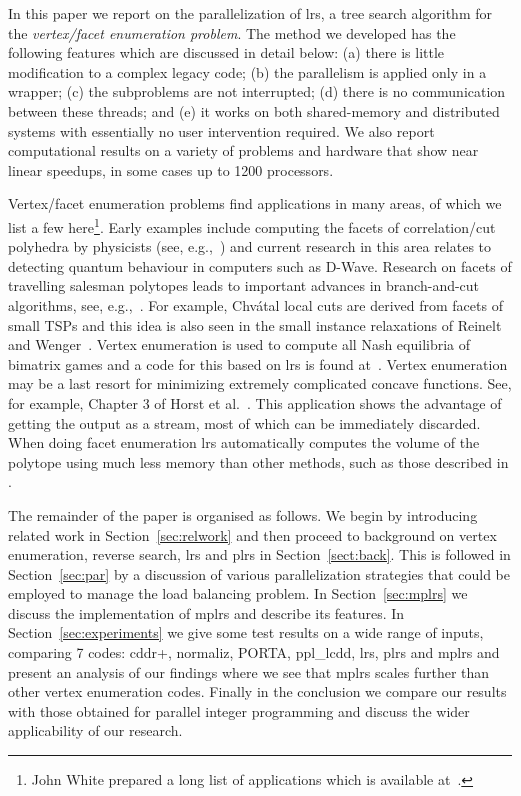 \documentclass[a4paper,11pt]{article}   \usepackage{authblk} \usepackage[top=1.9cm,bottom=1.9cm,left=1.9cm,right=1.9cm]{geometry}
\newcommand{\progname}{\textsf}
\newcommand{\lrs}{\progname{lrs}\xspace}
\newcommand{\plrs}{\progname{plrs}\xspace}
\newcommand{\mplrs}{\progname{mplrs}\xspace}
\newcommand{\norm}{\progname{normaliz}\xspace}
\newcommand{\cdd}{\progname{cddr+}\xspace}
\newcommand{\porta}{\progname{PORTA}\xspace}
\newcommand{\ppl}{\progname{ppl\_lcdd}\xspace}
\begin{document}
In this paper we report on the parallelization of \lrs, a tree search algorithm for the {\em vertex/facet enumeration problem}.
The method we developed has the following features which are discussed in detail below:
(a) there is little modification to a complex legacy code;
(b) the parallelism is applied only in a wrapper;
(c) the subproblems are not interrupted;
(d) there is no communication between these threads;
and (e) it works on both shared-memory and distributed systems with essentially no user intervention required.
We also report computational results on a variety of problems and hardware that show near linear speedups, in some cases up to 1200 processors.


Vertex/facet enumeration problems find applications in many areas, of which
we list a few here\footnote{John White prepared a long list of applications
which is available at~\cite{lrs}.}.
Early examples include computing the facets of correlation/cut polyhedra by 
physicists (see, e.g.,~\cite{ceder1994,DL97}) and current research in 
this area relates to detecting quantum behaviour in computers such as D-Wave.
Research on facets of travelling salesman polytopes 
leads to important advances in branch-and-cut algorithms, see, e.g.,~\cite{ABCC}.
For example, Chv\'{a}tal local cuts are derived from
facets of small TSPs and this idea is also seen in the small instance relaxations
of Reinelt and Wenger~\cite{RW2003}.
Vertex enumeration is used to compute all Nash equilibria of bimatrix games and a code
for this based on \lrs is found at~\cite{lrs}. 
Vertex enumeration may be a last resort for minimizing extremely
complicated concave functions.
See, for example, Chapter 3 of Horst et al.~\cite{HPT02}.
This application shows the advantage of getting the output as a stream, most
of which can be immediately discarded.
When doing facet enumeration \lrs automatically computes the volume of the polytope
using much less memory than other methods, such as those described in \cite{FP16}.

The remainder of the paper is organised as follows.
We begin by introducing related work in Section~\ref{sec:relwork} and then proceed to
background on vertex enumeration, reverse search, \lrs and \plrs in Section~\ref{sect:back}.
This is followed in Section~\ref{sec:par} by a discussion of
various parallelization strategies that could be employed to manage the load balancing
problem. In Section~\ref{sec:mplrs} we discuss the implementation of \mplrs and
describe its features.
In Section~\ref{sec:experiments} we give some test results on a wide range of inputs,
comparing 7 codes: \cdd, \norm, \porta, \ppl, \lrs, \plrs and \mplrs and present an
analysis of our findings where we see that \mplrs scales further than other vertex
enumeration codes. Finally in the conclusion we compare our results with
those obtained for parallel integer programming and discuss the wider applicability of
our research.
\end{document}

